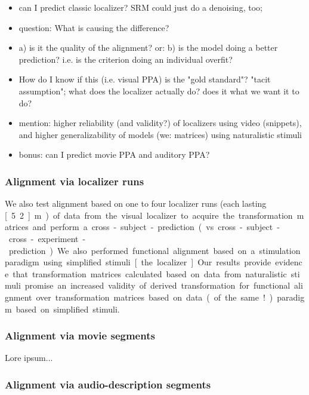 
\begin{itemize}
    \item can I predict classic localizer?  SRM could just do a denoising, too;
    \item question: What is causing the difference?
    \item a) is it the quality of the alignment? or:
        b) is the model doing a better prediction?
        i.e. is the criterion doing an individual overfit?
    \item How do I know if this (i.e. visual PPA) is the "gold standard"?
        "tacit assumption";
        what does the localizer actually do?
        does it what we want it to do?
    \item mention: higher reliability (and validity?) of localizers using video
        (snippets), and higher generalizability of models (we: matrices) using
        naturalistic stimuli
    \item bonus: can I predict movie PPA and auditory PPA?
\end{itemize}



\subsubsection{Alignment via localizer runs}

%
We also test alignment based on one to four localizer runs (each lasting
\unit[5.2]{m}) of data from the visual localizer to acquire the transformation
matrices and perform a cross-subject-prediction (vs.
cross-subject-cross-experiment-prediction).

%
We also performed functional alignment based on a stimulation paradigm using
simplified stimuli [the localizer].
%
Our results provide evidence that transformation matrices calculated based on
data from naturalistic stimuli promise an increased validity of derived
transformation for functional alignment over transformation matrices based on
data (of the same!) paradigm based on simplified stimuli.


\subsubsection{Alignment via movie segments}

Lore ipsum...

\subsubsection{Alignment via audio-description segments}

